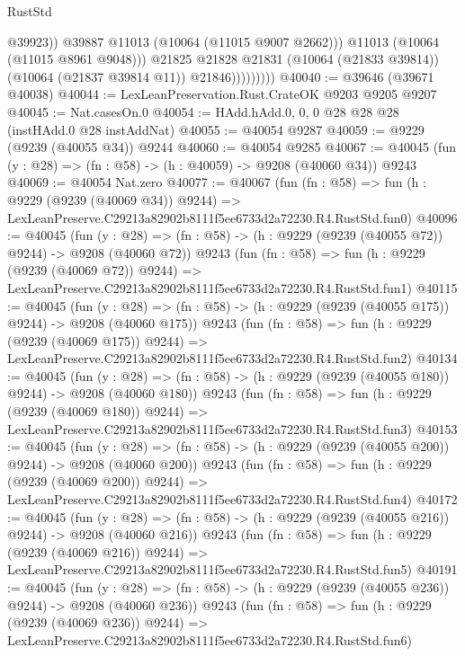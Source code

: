 \begin{lexlean}{RustStd}
\begin{coremodule}
                              @39923))
                          @39887
                          @11013
                          (@10064 (@11015 @9007 @2662)))
                        @11013
                        (@10064 (@11015 @8961 @9048)))
                      @21825
                      @21828
                      @21831
                      (@10064 (@21833 @39814))
                      (@10064 (@21837 @39814 @11))
                      @21846)))))))))
@40040 := @39646 (@39671 @40038)
@40044 := LexLeanPreservation.Rust.CrateOK @9203 @9205 @9207
@40045 := Nat.casesOn.{0}
@40054 := HAdd.hAdd.{0, 0, 0} @28 @28 @28 (instHAdd.{0} @28 instAddNat)
@40055 := @40054 @9287
@40059 := @9229 (@9239 (@40055 @34)) @9244
@40060 := @40054 @9285
@40067 := @40045 (fun (y : @28) => (fn : @58) -> (h : @40059) -> @9208 (@40060 @34)) @9243
@40069 := @40054 Nat.zero
@40077 := @40067
    (fun (fn : @58) =>
    fun (h : @9229 (@9239 (@40069 @34)) @9244) =>
    LexLeanPreserve.C29213a82902b8111f5ee6733d2a72230.R4.RustStd.fun0)
@40096 := @40045
    (fun (y : @28) => (fn : @58) -> (h : @9229 (@9239 (@40055 @72)) @9244) -> @9208 (@40060 @72))
    @9243
    (fun (fn : @58) =>
    fun (h : @9229 (@9239 (@40069 @72)) @9244) =>
    LexLeanPreserve.C29213a82902b8111f5ee6733d2a72230.R4.RustStd.fun1)
@40115 := @40045
    (fun (y : @28) => (fn : @58) -> (h : @9229 (@9239 (@40055 @175)) @9244) -> @9208 (@40060 @175))
    @9243
    (fun (fn : @58) =>
    fun (h : @9229 (@9239 (@40069 @175)) @9244) =>
    LexLeanPreserve.C29213a82902b8111f5ee6733d2a72230.R4.RustStd.fun2)
@40134 := @40045
    (fun (y : @28) => (fn : @58) -> (h : @9229 (@9239 (@40055 @180)) @9244) -> @9208 (@40060 @180))
    @9243
    (fun (fn : @58) =>
    fun (h : @9229 (@9239 (@40069 @180)) @9244) =>
    LexLeanPreserve.C29213a82902b8111f5ee6733d2a72230.R4.RustStd.fun3)
@40153 := @40045
    (fun (y : @28) => (fn : @58) -> (h : @9229 (@9239 (@40055 @200)) @9244) -> @9208 (@40060 @200))
    @9243
    (fun (fn : @58) =>
    fun (h : @9229 (@9239 (@40069 @200)) @9244) =>
    LexLeanPreserve.C29213a82902b8111f5ee6733d2a72230.R4.RustStd.fun4)
@40172 := @40045
    (fun (y : @28) => (fn : @58) -> (h : @9229 (@9239 (@40055 @216)) @9244) -> @9208 (@40060 @216))
    @9243
    (fun (fn : @58) =>
    fun (h : @9229 (@9239 (@40069 @216)) @9244) =>
    LexLeanPreserve.C29213a82902b8111f5ee6733d2a72230.R4.RustStd.fun5)
@40191 := @40045
    (fun (y : @28) => (fn : @58) -> (h : @9229 (@9239 (@40055 @236)) @9244) -> @9208 (@40060 @236))
    @9243
    (fun (fn : @58) =>
    fun (h : @9229 (@9239 (@40069 @236)) @9244) =>
    LexLeanPreserve.C29213a82902b8111f5ee6733d2a72230.R4.RustStd.fun6)

\end{coremodule}
\end{lexlean}
